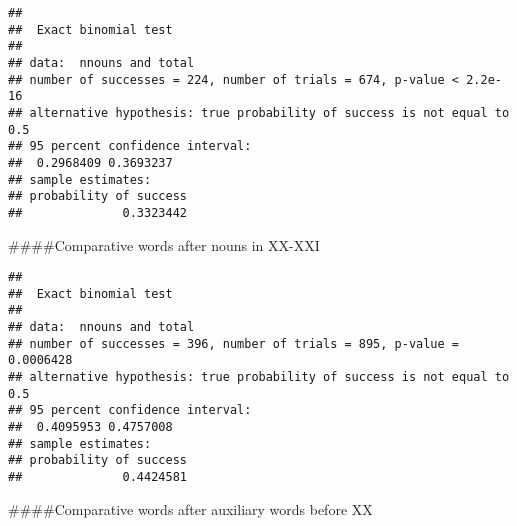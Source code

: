 \documentclass[
]{article}
\newenvironment{Shaded}{\begin{snugshade}}{\end{snugshade}}
\newcommand{\DecValTok}[1]{\textcolor[rgb]{0.00,0.00,0.81}{#1}}
\newcommand{\KeywordTok}[1]{\textcolor[rgb]{0.13,0.29,0.53}{\textbf{#1}}}
\newcommand{\NormalTok}[1]{#1}
\newcommand{\OperatorTok}[1]{\textcolor[rgb]{0.81,0.36,0.00}{\textbf{#1}}}
\newcommand{\StringTok}[1]{\textcolor[rgb]{0.31,0.60,0.02}{#1}}
\begin{document}
\begin{verbatim}
## 
##  Exact binomial test
## 
## data:  nnouns and total
## number of successes = 224, number of trials = 674, p-value < 2.2e-16
## alternative hypothesis: true probability of success is not equal to 0.5
## 95 percent confidence interval:
##  0.2968409 0.3693237
## sample estimates:
## probability of success 
##              0.3323442
\end{verbatim}

\#\#\#\#Comparative words after nouns in XX-XXI

\begin{Shaded}
\end{Shaded}

\begin{verbatim}
## 
##  Exact binomial test
## 
## data:  nnouns and total
## number of successes = 396, number of trials = 895, p-value = 0.0006428
## alternative hypothesis: true probability of success is not equal to 0.5
## 95 percent confidence interval:
##  0.4095953 0.4757008
## sample estimates:
## probability of success 
##              0.4424581
\end{verbatim}

\#\#\#\#Comparative words after auxiliary words before XX

\begin{Shaded}
\end{Shaded}
\end{document}
